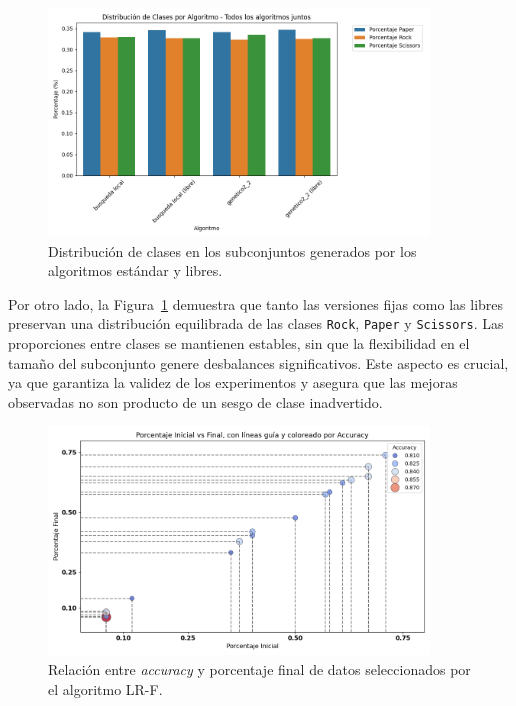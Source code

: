 \begin{figure}[htp]
    \centering
    \includegraphics[width=0.9\textwidth]{imagenes/evaluaciones/libres/distribucion-clases}
    \caption{Distribución de clases en los subconjuntos generados por los algoritmos estándar y libres.}
    \label{fig:distribucion_libres}
\end{figure}

Por otro lado, la Figura~\ref{fig:distribucion_libres} demuestra que tanto las versiones fijas como las libres preservan una
distribución equilibrada de las clases \texttt{Rock}, \texttt{Paper} y \texttt{Scissors}.
Las proporciones entre clases se mantienen estables, sin que la flexibilidad en el tamaño del subconjunto genere desbalances significativos.
Este aspecto es crucial, ya que garantiza la validez de los experimentos y asegura que las mejoras observadas no son producto de un sesgo de clase inadvertido.


\begin{figure}[htp]
    \centering
    \includegraphics[width=0.9\textwidth]{imagenes/evaluaciones/libres/scatter_lr-f}
    \caption{Relación entre \textit{accuracy} y porcentaje final de datos seleccionados por el algoritmo LR-F.}
    \label{fig:scatter_bl_f}
\end{figure}

